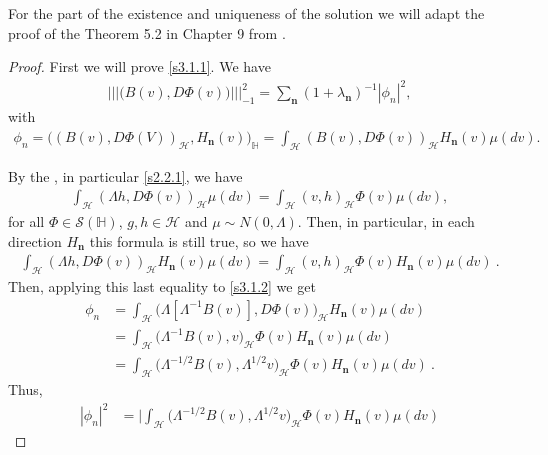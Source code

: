 \documentclass[review,onefignum,onetabnum]{siamart190516}
\begin{document}
    For the part of the existence and uniqueness of the solution we will adapt
    the proof of the Theorem 5.2 in Chapter 9 from \cite{liu}.
\begin{proof}
    First we will prove \eqref{s3.1.1}. We have
    \begin{align*}
        ||| \big(B(v),D\Phi(v) \big) |||_{-1}^2 =\sum_{\mathbf{n}}
        (1+\lambda_{\mathbf{n}})^{-1}|\phi_n|^2 ,
    \end{align*}
    with
    \begin{align}
        \phi_n=
        \Big(
            (B(v),D\Phi(V))_{\mathcal{H}}, H_{\mathbf{n}}(v)
        \Big)_{\mathbb{H}}
        =\int_{\mathcal{H}} (B(v),D\Phi(v))_{\mathcal{H}} H_{\mathbf{n}}(v)
        \mu(dv).\label{s3.1.2}
\end{align}

By the , in particular \eqref{s2.2.1}, we have
\begin{align*}
 \int_{\mathcal{H}} (\Lambda h,D\Phi(v))_{\mathcal{H}}  \mu(dv) =
\int_{\mathcal{H}} (v,h)_{\mathcal{H}} \Phi(v)  \mu(dv) ,
\end{align*}
for all $\Phi\in \mathcal{S}(\mathbb{H})$, $g,h\in \mathcal{H}$ and $\mu\sim
N(0,\Lambda)$. Then, in particular, in each direction $H_{\mathbf{n}}$
this formula is still true, so we have
\begin{align*}
 \int_{\mathcal{H}} (\Lambda h,D\Phi(v))_{\mathcal{H}} H_{\mathbf{n}}(v)
\mu(dv) =
 \int_{\mathcal{H}} (v,h)_{\mathcal{H}} \Phi(v) H_{\mathbf{n}}(v) \mu(dv) \ .
\end{align*}
Then, applying this last equality to \eqref{s3.1.2} we get
\begin{align}
 \phi_n &=\int_{\mathcal{H}}
\big(\Lambda[\Lambda^{-1}B(v)],D\Phi(v)\big)_{\mathcal{H}} H_{\mathbf{n}}(v)
\mu(dv)\nonumber\\
 &= \int_{\mathcal{H}} \big(\Lambda^{-1}B(v),v \big)_{\mathcal{H}} \Phi(v)
H_{\mathbf{n}}(v) \mu(dv)\nonumber\\
 &= \int_{\mathcal{H}} \big(\Lambda^{-1/2}B(v),\Lambda^{1/2}v
\big)_{\mathcal{H}} \Phi(v) H_{\mathbf{n}}(v) \mu(dv) \nonumber
    \ .
\end{align}
Thus,
\begin{equation}
    \label{s3.1.3}
    \begin{aligned}
        |\phi_n |^2 &=
            \Bigg|
                \int_{\mathcal{H}}
                    \big(
                        \Lambda^{-1/2}B(v),\Lambda^{1/2}v
                    \big)_{\mathcal{H}} \Phi(v)
                    H_{\mathbf{n}}(v) \mu(dv)

\end{aligned}
\end{equation}
\end{proof}
\end{document}

